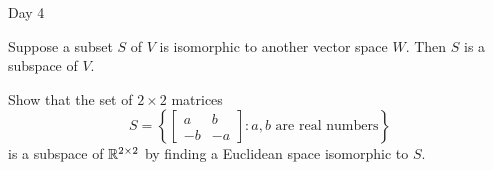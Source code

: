\begin{applicationActivities}{Day 4}
\begin{fact}
  Suppose a subset \(S\) of \(V\) is isomorphic to another vector space
  \(W\).
  Then \(S\) is a subspace of \(V\).
\end{fact}

\begin{activity}{5}
  Show that the set of \(2\times 2\) matrices
  \[S=
    \left\{
    \begin{bmatrix}a&b\\-b&-a\end{bmatrix} :
    a,b\text{ are real numbers}
    \right\}
  \]
  is a subspace of \(\mathbb{R}^{2\times 2}\) by finding a Euclidean
  space isomorphic to \(S\).
\end{activity}



\end{applicationActivities}
